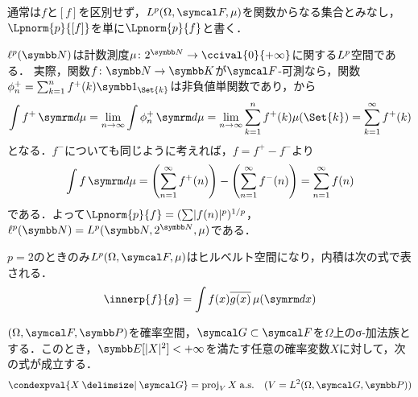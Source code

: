 \documentclass[../../main]{subfiles}
\begin{document}
通常は\(f\)と\([f]\)を区別せず，\(\Lebesgue{p}(\Omega,\sigmaalg{F},\mu)\)を関数からなる集合とみなし，\(\Lpnorm{p}{[f]}\)を単に\(\Lpnorm{p}{f}\)と書く．

\begin{example}
  \(\lebesgue{p}(\numset{N})\)は計数測度\(\mu\colon\powerset{\numset{N}}\to\ccival{0}{+\infty}\)に関する\(\Lebesgue{p}\)空間である．
  実際，関数\(f\colon\numset{N}\to\numset{K}\)が\(\sigmaalg{F}\)‐可測なら，関数\(\phi^{\mathord{+}}_n=\sum_{k=1}^nf^{\mathord{+}}(k)\indicator_{\Set{k}}\)は非負値単関数であり，から
  \[
    \int f^{\mathord{+}}\measured{\mu} = \lim_{n\to\infty}\int\phi_n^{\mathord{+}}\measured{\mu}
    = \lim_{n\to\infty}\sum_{k=1}^nf^{\mathord{+}}(k)\mu(\Set{k})
    = \sum_{k=1}^\infty f^{\mathord{+}}(k)
  \]
  となる．\(f^{\mathord{-}}\)についても同じように考えれば，\(f=f^{\mathord{+}}-f^{\mathord{-}}\)より
  \[
    \int f\measured{\mu} = \pqty*{\sum_{n=1}^\infty f^{\mathord{+}}(n)}-\pqty*{\sum_{n=1}^\infty f^{\mathord{-}}(n)}
    = \sum_{n=1}^\infty f(n)
  \]
  である．よって\(\Lpnorm{p}{f}=(\sum\abs{f(n)}^p)^{1/p}\)，\(\lebesgue{p}(\numset{N})=\Lebesgue{p}(\numset{N},\powerset{\numset{N}},\mu)\)である．
\end{example}

\begin{proposition}{}{}
  \(p=2\)のときのみ\(\Lebesgue{p}(\Omega,\sigmaalg{F},\mu)\)はヒルベルト空間になり，内積は次の式で表される．
  \[
    \innerp{f}{g} = \int f(x)\conj*{g(x)}\measured[x]{\mu}
  \]
\end{proposition}

\begin{proposition}{}{}
  \((\Omega,\sigmaalg{F},\prob)\)を確率空間，\(\sigmaalg{G}\subset\sigmaalg{F}\)を\(\Omega\)上のσ‐加法族とする．このとき，\(\expval[\abs{X}^2]<+\infty\)を満たす任意の確率変数\(X\)に対して，次の式が成立する．
  \[
    \condexpval{X\given\sigmaalg{G}} = \proj_VX\almostsurely\quad(V=\Lebesgue{2}(\Omega,\sigmaalg{G},\prob))
  \]
\end{proposition}
\end{document}
